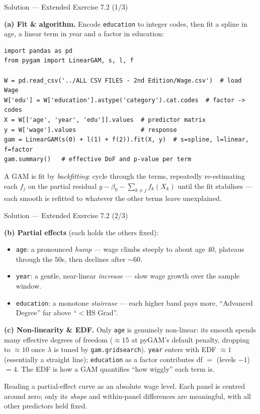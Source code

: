 \documentclass[aspectratio=169,11pt]{beamer}
\begin{document}
\begin{frame}[fragile]{Solution --- Extended Exercise 7.2 (1/3)}
\begin{solutionbox}
\textbf{(a) Fit \& algorithm.} Encode \texttt{education} to integer codes, then fit a spline in age, a linear term in year and a factor in education:
\begin{lstlisting}
import pandas as pd
from pygam import LinearGAM, s, l, f

W = pd.read_csv('../ALL CSV FILES - 2nd Edition/Wage.csv')  # load Wage
W['edu'] = W['education'].astype('category').cat.codes  # factor -> codes
X = W[['age', 'year', 'edu']].values  # predictor matrix
y = W['wage'].values                  # response
gam = LinearGAM(s(0) + l(1) + f(2)).fit(X, y)  # s=spline, l=linear, f=factor
gam.summary()   # effective DoF and p-value per term
\end{lstlisting}
A GAM is fit by \emph{backfitting}: cycle through the terms, repeatedly re-estimating each $f_j$ on the partial residual $y-\beta_0-\sum_{k\neq j}f_k(X_k)$ until the fit stabilises --- each smooth is refitted to whatever the other terms leave unexplained.
\end{solutionbox}
\end{frame}

\begin{frame}{Solution --- Extended Exercise 7.2 (2/3)}
\begin{solutionbox}
\textbf{(b) Partial effects} (each holds the others fixed):
\begin{itemize}
  \item \texttt{age}: a pronounced \emph{hump} --- wage climbs steeply to about age $40$, plateaus through the $50$s, then declines after $\sim$60.
  \item \texttt{year}: a gentle, near-linear \emph{increase} --- slow wage growth over the sample window.
  \item \texttt{education}: a monotone \emph{staircase} --- each higher band pays more, ``Advanced Degree'' far above ``$<$HS Grad''.
\end{itemize}

\textbf{(c) Non-linearity \& EDF.} Only \texttt{age} is genuinely non-linear: its smooth spends many effective degrees of freedom ($\approx15$ at pyGAM's default penalty, dropping to $\approx10$ once $\lambda$ is tuned by \texttt{gam.gridsearch}). \texttt{year} enters with EDF $\approx1$ (essentially a straight line); \texttt{education} as a factor contributes df $=$ (levels $-1$) $=4$. The EDF is how a GAM quantifies ``how wiggly'' each term is.
\end{solutionbox}
\begin{mistake}
Reading a partial-effect curve as an absolute wage level. Each panel is centred around zero; only its \emph{shape} and within-panel differences are meaningful, with all other predictors held fixed.
\end{mistake}
\end{frame}
\end{document}
